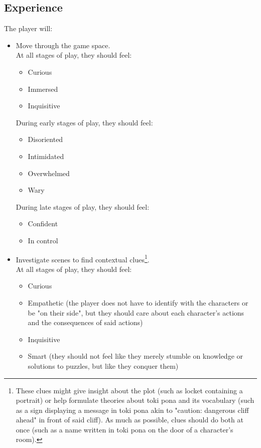 \documentclass{scrartcl}
\begin{document}
		\subsection{Experience}
			The player will:
			\begin{itemize}
				\item Move through the game space. \\
				At all stages of play, they should feel:
				\begin{itemize}
					\item Curious
					\item Immersed
					\item Inquisitive
				\end{itemize}
				During early stages of play, they should feel: 
				\begin{itemize}
					\item Disoriented
					\item Intimidated
					\item Overwhelmed
					\item Wary
				\end{itemize}
				During late stages of play, they should feel:
				\begin{itemize}
					\item Confident
					\item In control
				\end{itemize}
				\item Investigate scenes to find contextual clues\footnote{These clues might give insight about the plot (such as locket containing a portrait) or help formulate theories about toki pona and its vocabulary (such as a sign displaying a message in toki pona akin to "caution: dangerous cliff ahead" in front of said cliff). As much as possible, clues should do both at once (such as a name written in toki pona on the door of a character's room).}.\\
				At all stages of play, they should feel:
				\begin{itemize}
					\item Curious
					\item Empathetic (the player does not have to identify with the characters or be "on their side", but they should care about each character's actions and the consequences of said actions)
					\item Inquisitive
					\item Smart (they should not feel like they merely stumble on knowledge or solutions to puzzles, but like they conquer them)

\end{itemize}
\end{itemize}
\end{document}
